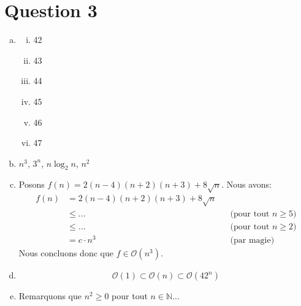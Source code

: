 \documentclass{article}
\newcommand{\N}{\mathbb{N}}
\renewcommand{\O}{\mathcal{O}}
\begin{document}
\section*{Question 3}

\begin{enumerate}[(a)]

\item

  \begin{multicols}{2}
    \begin{enumerate}[(i)]
    \item 42
    \item 43
    \item 44
    \item 45
    \item 46
    \item 47        
    \end{enumerate}
  \end{multicols} 

\item $n^3$, $3^n$, $n \log_2 n$, $n^2$

\item Posons $f(n) = 2(n-4)(n+2)(n+3) + 8 \sqrt{n}$. Nous avons:
  \begin{align*}
    f(n)
    &= 2(n-4)(n+2)(n+3) + 8 \sqrt{n} \\
    &\leq ... && \text{(pour tout $n \geq 5$)}  \\
    &\leq ... && \text{(pour tout $n \geq 2$)}  \\
    &= c \cdot n^3 && \text{(par magie)}
  \end{align*}
  Nous concluons donc que $f \in \O(n^3)$.

\item

  \[ \O(1) \subset \O(n) \subset \O(42^n) \]

\item Remarquons que $n^2 \geq 0$ pour tout $n \in \N$...

\end{enumerate}
\end{document}
